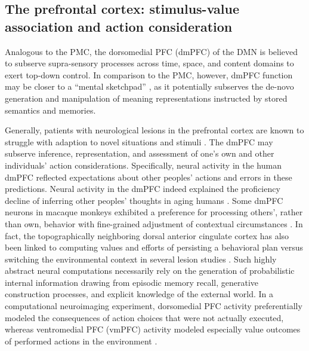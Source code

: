 \documentclass[10pt,letterpaper]{article}
\begin{document}
\subsection{The prefrontal cortex: stimulus-value association and action consideration}
Analogous to the PMC,
the dorsomedial PFC (dmPFC) of the DMN is believed to subserve
supra-sensory processes
across time, space, and content domains to
exert top-down control.
In comparison to the PMC, however,
dmPFC function may be closer to a
``mental sketchpad'' \citep{goldman1996prefrontal}, as it
potentially subserves the de-novo generation and manipulation
of meaning representations instructed by stored semantics and memories.



Generally,
patients with neurological lesions in the prefrontal cortex
are known to struggle with
adaption to novel situations and stimuli
\citep{stuss1986frontal}.
The dmPFC may subserve inference, representation, and assessment
of one's own and other individuals' action considerations.
Specifically, neural activity in the human dmPFC
reflected expectations about other peoples' actions and
errors in these predictions.
Neural activity in the dmPFC indeed explained the proficiency decline
of inferring other peoples' thoughts in aging humans \citep{moran2012social}.
Some dmPFC neurons in macaque monkeys exhibited a preference
for processing others', rather than own, behavior
with fine-grained adjustment of contextual circumstances \citep{yoshida2010neural}.
In fact, the topographically neighboring dorsal anterior cingulate cortex
has also been linked to computing values and efforts of
persisting a behavioral plan versus switching the
environmental context in several lesion studies \citep{kolling2016value}.
%
Such highly abstract neural computations necessarily rely on the
generation of probabilistic internal information drawing from
episodic memory recall, generative construction processes,
and explicit knowledge of the external world.
%
In a computational neuroimaging experiment,
dorsomedial PFC activity preferentially modeled the consequences of
action choices that were not actually executed,
whereas ventromedial PFC (vmPFC) activity
modeled especially value outcomes of performed actions in the environment
\citep{nicolle2012agent}.
\end{document}

